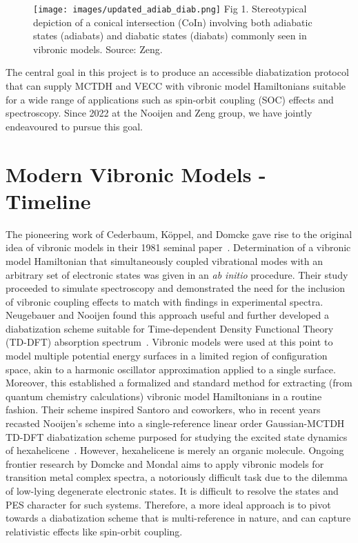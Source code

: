 \begin{figure}[!ht]
    \center
    \texttt{[image: images/updated\_adiab\_diab.png]}
    \center
    \small{Fig 1. Stereotypical depiction of a conical intersection (CoIn) involving both adiabatic states (adiabats) and diabatic states (diabats) commonly seen in vibronic models. Source: Zeng.}
\end{figure}

The central goal in this project is to produce an accessible diabatization protocol that can supply MCTDH and VECC with vibronic model Hamiltonians suitable for a wide range of applications such as spin-orbit coupling (SOC) effects and spectroscopy. Since 2022 at the Nooijen and Zeng group, we have jointly endeavoured to pursue this goal.

\section{Modern Vibronic Models - Timeline}

The pioneering work of Cederbaum, Köppel, and Domcke gave rise to the original idea of vibronic models in their 1981 seminal paper~\cite{cederbaum1981multimode}. Determination of a vibronic model Hamiltonian that simultaneously coupled vibrational modes with an arbitrary set of electronic states was given in an \textit{ab initio} procedure. Their study proceeded to simulate spectroscopy and demonstrated the need for the inclusion of vibronic coupling effects to match with findings in experimental spectra. Neugebauer and Nooijen found this approach useful and further developed a diabatization scheme suitable for Time-dependent Density Functional Theory (TD-DFT) absorption spectrum~\cite{nooijen2003first,neugebauer2004vibronic}. Vibronic models were used at this point to model multiple potential energy surfaces in a limited region of configuration space, akin to a harmonic oscillator approximation applied to a single surface. Moreover, this established a formalized and standard method for extracting (from quantum chemistry calculations) vibronic model Hamiltonians in a routine fashion. Their scheme inspired Santoro and coworkers, who in recent years recasted Nooijen's scheme into a single-reference linear order Gaussian-MCTDH TD-DFT diabatization scheme purposed for studying the excited state dynamics of hexahelicene~\cite{yaghoubi2020ultrafast}. However, hexahelicene is merely an organic molecule. Ongoing frontier research by Domcke and Mondal aims to apply vibronic models for transition metal complex spectra, a notoriously difficult task due to the dilemma of low-lying degenerate electronic states. It is difficult to resolve the states and PES character for such systems. Therefore, a more ideal approach is to pivot towards a diabatization scheme that is multi-reference in nature, and can capture relativistic effects like spin-orbit coupling. \\

